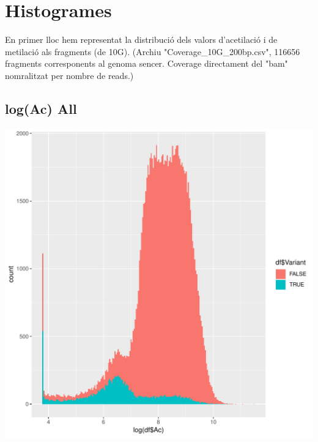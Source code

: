 \documentclass{article}\usepackage[]{graphicx}\usepackage[]{color}
\newenvironment{knitrout}{}{} %
\begin{document}
\section{Histogrames}
En primer lloc hem representat la distribució dels valors d'acetilació i de metilació als fragments (de 10G). (Archiu "Coverage\_10G\_200bp.csv", 116656 fragments corresponents al genoma sencer. Coverage directament del "bam" nomralitzat per nombre de reads.)
\subsection{log(Ac) All}
\begin{knitrout}
\color{fgcolor}

{\centering \includegraphics[width=1\linewidth]{figure/minimal-dens_all-1} 

}



\end{knitrout}
\clearpage
\end{document}
